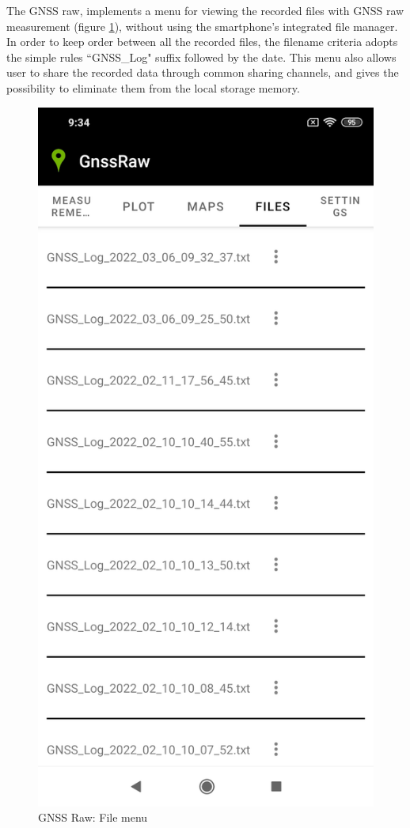 The GNSS raw, implements a menu for viewing the recorded files with GNSS raw measurement (figure \ref{FIG:gnssraw_file}), without using the smartphone's integrated file manager. In order to keep order between all the recorded files, the filename criteria adopts the simple rules ``GNSS\_Log" suffix followed by the date. This menu also allows user to share the recorded data through common sharing channels, and gives the possibility to eliminate them from the local storage memory. 

\begin{figure}[H] 
	\centering
	\includegraphics[scale=0.15,frame]{fig/gnssraw_files.jpg} 
	\caption{GNSS Raw: File menu}
	\label{FIG:gnssraw_file} 
\end{figure}
